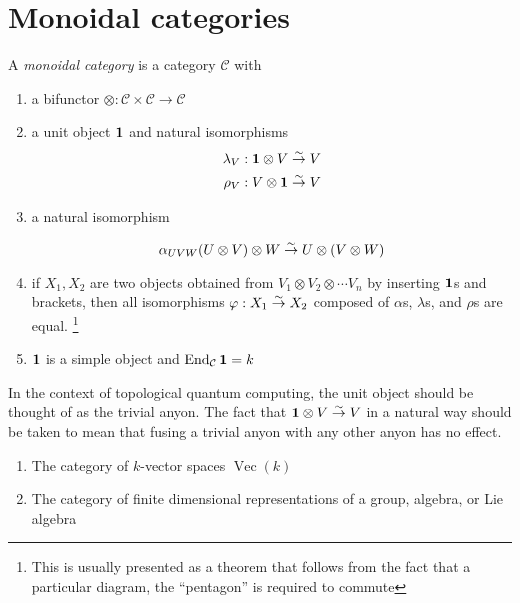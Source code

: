 \section{Monoidal categories}
\begin{defn}
    A \emph{monoidal category} is a category $\mathcal{C}$ with 
    \begin{enumerate}
    \renewcommand{\labelenumi}{\roman{enumi})}
        \item a bifunctor $\otimes: \mathcal{C} \times \mathcal{C} \to
            \mathcal{C}$
        \item a unit object $\mathbf{1}$ and natural isomorphisms
            \begin{align}
                \lambda_V &: \mathbf{1} \otimes V \overset{\sim}{\rightarrow} V \\
                \rho_V &: V \otimes \mathbf{1} \overset{\sim}{\rightarrow} V
            \end{align}
        \item a natural isomorphism 

            \begin{equation}
                \alpha_{UVW} (U \otimes V) \otimes W \overset{\sim}{\rightarrow} U \otimes (V \otimes W)
            \end{equation}

        \item if $X_1, X_2$ are two objects obtained from $V_1 \otimes V_2
            \otimes \cdots V_n$ by inserting $\mathbf{1}$s and brackets, then all
            isomorphisms $\varphi: X_1 \overset{\sim}{\rightarrow} X_2$ composed of $\alpha$s,
            $\lambda$s, and $\rho$s are equal. 
            \footnote{This is usually presented as a theorem that follows from
            the fact that a particular diagram, the ``pentagon'' is required to
            commute}
        \item $\mathbf{1}$ is a simple object and $\operatorname{End}_\mathcal{C} \mathbf{1} = k$
    \end{enumerate}

\end{defn}

In the context of topological quantum computing, the unit object should be
thought of as the trivial anyon. The fact that $\mathbf{1} \otimes V \overset{\sim}{\rightarrow} V$
in a natural way should be taken to mean that fusing a trivial anyon with any
other anyon has no effect.

\begin{example}
    \begin{enumerate}
    \renewcommand{\labelenumi}{\roman{enumi})}
        \item The category of $k$-vector spaces $\operatorname{Vec}(k)$
        \item The category of finite dimensional representations of a group, algebra, or Lie algebra
    \end{enumerate}
\end{example}


